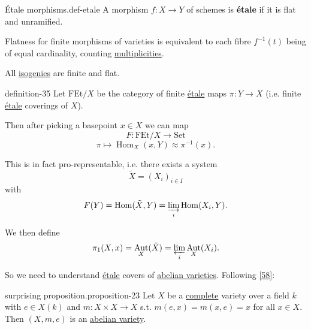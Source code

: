 \documentclass[10pt,]{book}
\newcommand{\terminology}[1]{\textbf{#1}}
\numberwithin{equation}{section}
\DeclareMathOperator{\Hom}{Hom}
\DeclareMathOperator{\Aut}{Aut}
\begin{document}
\begin{definition}{Étale morphisms.}{def-etale}%
\hypertarget{p-276}{}%
A morphism \(f\colon X\to Y\) of schemes is \terminology{étale} if it is flat and unramified.%
\par
\hypertarget{p-277}{}%
Flatness for finite morphisms of varieties is equivalent to each fibre \(f^{-1}(t)\) being of equal cardinality, counting \hyperref[def-riem-order-vanish]{multiplicities}.%
\end{definition}
\hypertarget{p-278}{}%
All \hyperref[def-supersing-isog-isog]{isogenies} are finite and flat.%
\begin{definition}{}{definition-35}%
\hypertarget{p-279}{}%
Let \(\mathrm{FEt}/X\) be the category of finite \hyperref[def-etale]{étale} maps \(\pi\colon Y \to X\) (i.e. finite \hyperref[def-etale]{étale} coverings of \(X\)).%
\par
\hypertarget{p-280}{}%
Then after picking a basepoint \(x\in X\) we can map%
\begin{equation*}
F\colon \mathrm{FEt}/X\to \mathrm{Set}
\end{equation*}
%
\begin{equation*}
\pi\mapsto \Hom_X(x,Y) \approx\pi^{-1}(x)\text{.}
\end{equation*}
%
\par
\hypertarget{p-281}{}%
This is in fact pro-representable, i.e. there exists a system%
\begin{equation*}
\tilde X = (X_i)_{i\in I}
\end{equation*}
with%
\begin{equation*}
F(Y) = \Hom(\tilde X ,Y) = \varinjlim_i \Hom(X_i, Y)\text{.}
\end{equation*}
%
\par
\hypertarget{p-282}{}%
We then define%
\begin{equation*}
\pi_1(X,x) = \Aut_X(\tilde X) = \varprojlim_i \Aut_X(X_i)\text{.}
\end{equation*}
%
\end{definition}
\hypertarget{p-283}{}%
So we need to understand \hyperref[def-etale]{étale} covers of \hyperref[def-buntes-abvar]{abelian varieties}. Following \hyperlink{bib-vandergeer-moonen}{[58]}:%
\begin{proposition}{surprising proposition.}{}{proposition-23}%
\hypertarget{p-284}{}%
Let \(X\)  be a \hyperref[def-abelian-complete-var]{complete} variety over a field \(k\) with \(e\in X(k)\) and \(m \colon X\times X\to X\) s.t. \(m(e,x) = m(x,e) = x\) for all \(x \in X\). Then \((X, m,e)\) is an \hyperref[def-buntes-abvar]{abelian variety}.%
\end{proposition}
\end{document}
